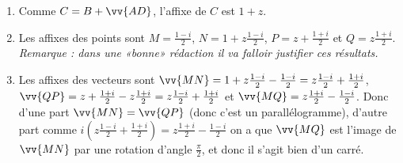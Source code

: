\documentclass[a4paper,12pt,reqno]{amsart}
\begin{document}
\begin{solution}
  \begin{enumerate}
    \item Comme $C = B + \vv{AD}$, l'affixe de $C$ est $1+z$.
    \item Les affixes des points sont $M = \frac{1-i}{2}$, $N = 1+z\frac{1-i}{2}$, $P = z+\frac{1+i}{2}$ et $Q = z\frac{1+i}{2}$.\\
    \emph{Remarque : dans une «bonne» rédaction il va falloir justifier ces résultats.}
    \item Les affixes des vecteurs sont $\vv{MN} = 1+z\frac{1-i}{2} - \frac{1-i}{2} = z\frac{1-i}{2} + \frac{1+i}{2}$, $\vv{QP} = z+\frac{1+i}{2} - z\frac{1+i}{2} = z\frac{1-i}{2} + \frac{1+i}{2}$ et $\vv{MQ} = z\frac{1+i}{2} - \frac{1-i}{2}$. Donc d'une part $\vv{MN} = \vv{QP}$ (donc c'est un parallélogramme), d'autre part comme  $i\left(z\frac{1-i}{2} + \frac{1+i}{2}\right) = z\frac{1+i}{2} - \frac{1-i}{2}$ on a
    que $\vv{MQ}$ est l'image de $\vv{MN}$ par une rotation d'angle $\frac{\pi}{2}$, et donc il s'agit bien d'un carré.
  \end{enumerate}
\end{solution}
\end{document}
